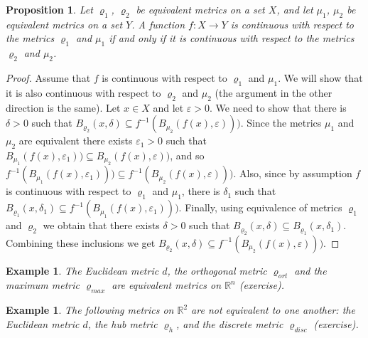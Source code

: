 \documentclass[11pt, letterpaper, oneside]{report}
\theoremstyle{pplain}
\newtheorem{proposition}[theorem]{Proposition}
\newtheorem{ITERMVALUE THM}[theorem]{Intermediate Value Theorem}
\newtheorem{HEINEBOREL THM}[theorem]{Heine-Borel Theorem}
\newtheorem{UMETR THM}[theorem]{Urysohn Metrization Theorem}
\newtheorem{UMETR2 THM}[theorem]{Urysohn Metrization Theorem (v.2)}
\theoremstyle{ddefinition}
\newtheorem{example}[theorem]{Example}
\theoremstyle{nnn}
\newtheorem{TDA NN}[theorem]{Topological Data Analysis. }
\theoremstyle{eexercise}
\newcommand{\R}{{\mathbb R}}
\begin{document}
\begin{proposition}
\label{EQUIV METRIC PROP}
Let $\varrho_{1}$, $\varrho_{2}$ be equivalent metrics on a set $X$, and let $\mu_{1}$, $\mu_{2}$ 
be equivalent metrics on a set $Y$.  A function  $f\colon X\to Y$ is continuous with respect 
to the metrics $\varrho_{1}$  and $\mu_{1}$ if and only if it is continuous with respect to the metrics 
$\varrho_{2}$ and $\mu_{2}$. 
\end{proposition}


\begin{proof}
Assume that $f$ is continuous with respect to $\varrho_{1}$ and $\mu_{1}$. We will show 
that it is also continuous with respect to $\varrho_{2}$ and $\mu_{2}$ (the argument in the other direction is the same). 
Let $x\in X$ and let $\varepsilon >0$.  We need to show that there is  $\delta>0$ such that  
$B_{\varrho_{2}}(x, \delta)\subseteq f^{-1}(B_{\mu_{2}}(f(x), \varepsilon)))$. 
Since the metrics $\mu_{1}$ and $\mu_{2}$ are equivalent there exists $\varepsilon_{1} > 0$ such that 
$B_{\mu_{1}}(f(x), \varepsilon_{1})) \subseteq B_{\mu_{2}}(f(x), \varepsilon))$, and so 
$f^{-1}(B_{\mu_{1}}(f(x), \varepsilon_{1}))) \subseteq f^{-1}(B_{\mu_{2}}(f(x), \varepsilon)))$.
 Also, since by assumption $f$ is continuous with respect to  $\varrho_{1}$  and $\mu_{1}$, 
 there is $\delta_{1}$ such that  $B_{\varrho_{1}}(x, \delta_{1})\subseteq f^{-1}(B_{\mu_{1}}(f(x), \varepsilon_{1})))$. 
Finally, using equivalence of metrics $\varrho_{1}$ and $\varrho_{2}$ we obtain that there exists $\delta > 0$
such that $B_{\varrho_{2}}(x, \delta)\subseteq B_{\varrho_{1}}(x, \delta_{1})$.  Combining these inclusions we
get  $B_{\varrho_{2}}(x, \delta) \subseteq f^{-1}(B_{\mu_{2}}(f(x), \varepsilon)))$.
\end{proof}

\begin{example}
\label{EQUIV METRIC EX}
The Euclidean metric $d$, the orthogonal metric $\varrho_{ort}$ and the 
maximum metric $\varrho_{max}$ are equivalent metrics on $\R^{n}$ (exercise). 

\end{example}

\begin{example}
\label{NONEQUIV METRIC EX}
The following metrics on $\R^{2}$ are not equivalent to one another:
the Euclidean metric $d$, the hub metric $\varrho_{h}$, and the discrete metric 
$\varrho_{disc}$ (exercise).
\end{example}
\end{document}
